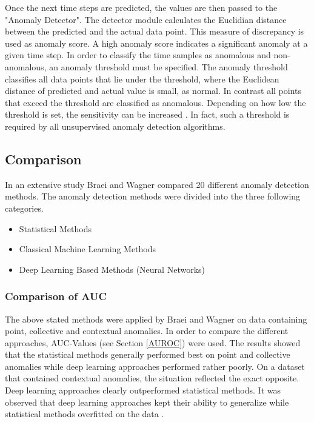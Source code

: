 Once the next time steps are predicted, the values are then passed to the "Anomaly Detector". The detector module calculates the Euclidian distance between the predicted and the actual data point. This measure of discrepancy is used as anomaly score. A high anomaly score indicates a significant anomaly at a given time step. In order to classify the time samples as anomalous and non-anomalous, an anomaly threshold must be specified. The anomaly threshold classifies all data points that lie under the threshold, where the Euclidean distance of predicted and actual value is small, as normal. In contrast all points that exceed the threshold are classified as anomalous. Depending on how low the threshold is set, the sensitivity can be increased \parencite{Munir2019}. In fact, such a threshold is required by all unsupervised anomaly detection algorithms. 

\clearpage
\subsection{Comparison} \label{comparison}
In an extensive study Braei and Wagner \parencite*{Braei2020} compared 20 different anomaly detection methods. The anomaly detection methods were divided into the three following  categories. 

\begin{itemize}
	\item Statistical Methods
	\item Classical Machine Learning Methods
	\item Deep Learning Based Methods (Neural Networks)
\end{itemize}


\subsubsection{Comparison of AUC}
The above stated methods were applied by Braei and Wagner \parencite*{Braei2020} on data containing point, collective and contextual anomalies. In order to compare the different approaches, AUC-Values (see Section \ref{AUROC}) were used. The results showed that the statistical methods generally performed best on point and collective anomalies while deep learning approaches performed rather poorly. On a dataset that contained contextual anomalies, the situation reflected the exact opposite. Deep learning approaches clearly outperformed statistical methods. It was observed that deep learning approaches kept their ability to generalize while statistical methods overfitted on the data \parencite{Braei2020}.

